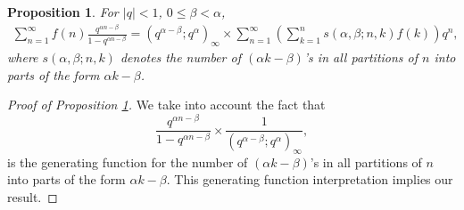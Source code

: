 \documentclass[12pt,reqno,a4letter]{article}
\numberwithin{figure}{section}
\numberwithin{table}{section}
\numberwithin{equation}{section}
\theoremstyle{plain}
\newtheorem{prop}[theorem]{Proposition}
\numberwithin{theorem}{section}
\theoremstyle{definition}
\begin{document}
\begin{prop}
\label{prop_GenLGF_p2} 
For $|q|<1$, $0\leq \beta<\alpha$,
\begin{align*}
\sum_{n=1}^{\infty} f(n) \frac{q^{\alpha n-\beta}}{1-q^{\alpha n-\beta}} = 
     (q^{\alpha-\beta};q^\alpha)_\infty \times \sum_{n=1}^{\infty} \left( 
     \sum_{k=1}^n s(\alpha, \beta; n,k) f(k)\right)  q^n,
\end{align*}
where $s(\alpha, \beta; n,k)$ denotes the number of 
$(\alpha k-\beta)$'s in all partitions of $n$ into parts of the form $\alpha k-\beta$.
\end{prop}
\begin{proof}[Proof of Proposition \ref{prop_GenLGF_p2}]
We take into account the fact that
$$\frac{q^{\alpha n-\beta}}{1-q^{\alpha n-\beta}} \times \frac{1}{(q^{\alpha-\beta};q^\alpha)_\infty},$$
is the generating function for the number of $(\alpha k-\beta)$'s in all partitions of $n$ into 
parts of the form $\alpha k-\beta$. This generating function interpretation implies our result. 
\end{proof}
\end{document}
